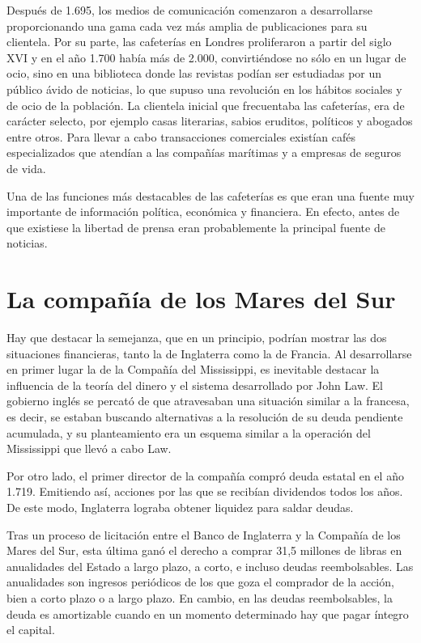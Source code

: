 Después de 1.695, los medios de comunicación comenzaron a desarrollarse proporcionando una gama cada vez más amplia de publicaciones para su clientela. Por su parte, las cafeterías en Londres proliferaron a partir del siglo XVI y en el año 1.700 había más de 2.000, convirtiéndose no sólo en un lugar de ocio, sino en una biblioteca donde las revistas podían ser estudiadas por un público ávido de noticias, lo que supuso una revolución en los hábitos sociales y de ocio de la población. La clientela inicial que frecuentaba las cafeterías, era de carácter selecto, por ejemplo casas literarias, sabios eruditos, políticos y abogados entre otros. Para llevar a cabo transacciones comerciales existían cafés especializados que atendían a las compañías marítimas y a empresas de seguros de vida.

Una de las funciones más destacables de las cafeterías es que eran una fuente muy importante de información política, económica y financiera. En efecto, antes de que existiese la libertad de prensa eran probablemente la principal fuente de noticias.

\section{La compañía de los Mares del Sur}

Hay que destacar la semejanza, que en un principio, podrían mostrar las dos situaciones financieras, tanto la de Inglaterra como la de Francia. Al desarrollarse en primer lugar la de la Compañía del Mississippi, es inevitable destacar la influencia de la teoría del dinero y el sistema desarrollado por John Law. El gobierno inglés se percató de que atravesaban una situación similar a la francesa, es decir, se estaban buscando alternativas a la resolución de su deuda pendiente acumulada, y su planteamiento era un esquema similar a la operación del Mississippi que llevó a cabo Law. 

Por otro lado, el primer director de la compañía compró deuda estatal en el año 1.719. Emitiendo así, acciones por las que se recibían dividendos todos los años. De este modo, Inglaterra lograba obtener liquidez para saldar deudas. 

Tras un proceso de licitación entre el Banco de Inglaterra y la Compañía de los Mares del Sur, esta última ganó el derecho a comprar 31,5 millones de libras en anualidades del Estado a largo plazo, a corto, e incluso deudas reembolsables. Las anualidades son ingresos periódicos de los que goza el comprador de la acción, bien a corto plazo o a largo plazo. En cambio, en las deudas reembolsables, la deuda es amortizable cuando en un momento determinado hay que pagar íntegro el capital. 

